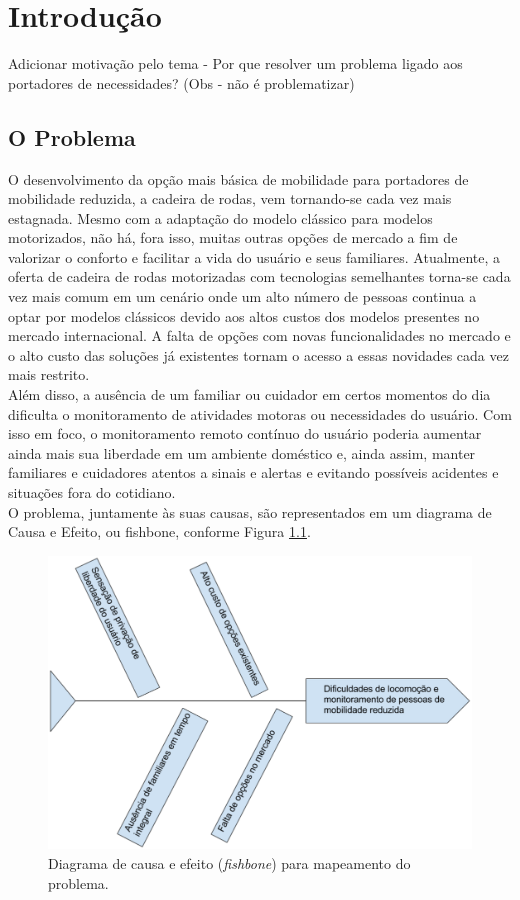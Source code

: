 \chapter{Introdução}

Adicionar motivação pelo tema - Por que resolver um problema ligado aos portadores de necessidades? (Obs - não é problematizar)

\section{O Problema}

O desenvolvimento da opção mais básica de mobilidade para portadores de mobilidade
reduzida, a cadeira de rodas, vem tornando-se cada vez mais estagnada. 
Mesmo com a adaptação do modelo clássico para modelos motorizados, não há, 
fora isso, muitas outras opções de mercado a fim de valorizar o conforto 
e facilitar a vida do usuário e seus familiares. Atualmente, a oferta de 
cadeira de rodas motorizadas com tecnologias semelhantes torna-se cada 
vez mais comum em um cenário onde um alto número de pessoas continua a optar 
por modelos clássicos devido aos altos custos dos modelos presentes no 
mercado internacional. A falta de opções com novas funcionalidades no mercado 
e o alto custo das soluções já existentes tornam o acesso a essas novidades
 cada vez mais restrito.\\
	
Além disso, a ausência de um familiar ou cuidador em certos momentos 
do dia 
dificulta o monitoramento de atividades motoras ou necessidades 
do usuário. 
Com isso em foco, o monitoramento remoto contínuo do usuário 
poderia 
aumentar ainda mais sua liberdade em um ambiente doméstico e, ainda 
assim, 
manter familiares e cuidadores atentos a sinais e alertas e evitando 
possíveis 
acidentes e situações fora do cotidiano.\\
	
O problema, juntamente às suas causas, são representados em um diagrama 
de Causa e Efeito, ou fishbone, conforme Figura \ref{fishbone}.
	
\begin{figure}[h]
    \centering
    \label{fishbone}
    \includegraphics[keepaspectratio=true,scale=0.5]{figuras/fishbone.eps}
    \caption{Diagrama de causa e efeito (\textit{fishbone}) para mapeamento do problema.}
\end{figure}


